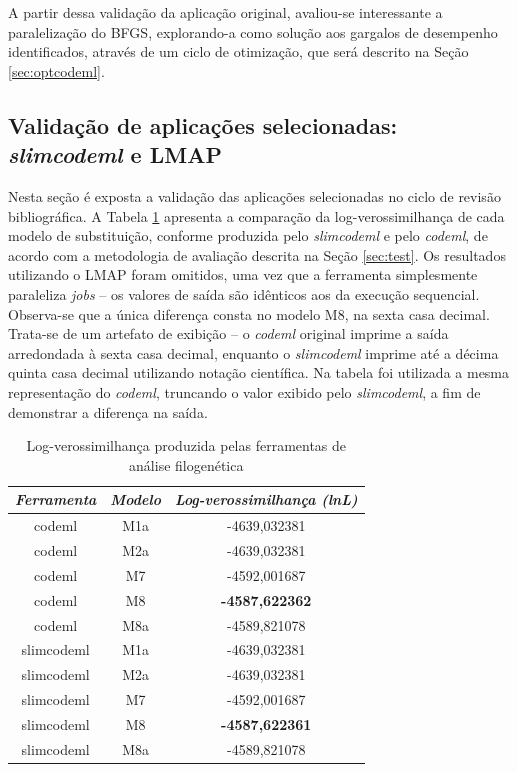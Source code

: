 \documentclass[cic,tc]{iiufrgs}
\begin{document}
A partir dessa validação da aplicação original, avaliou-se interessante a
paralelização do BFGS, explorando-a como solução aos gargalos de desempenho
identificados, através de um ciclo de otimização, que será descrito na Seção
\ref{sec:optcodeml}.

\subsection{Validação de aplicações selecionadas: \textit{slimcodeml} e LMAP}
\label{sec:slimeval}

Nesta seção é exposta a validação das aplicações selecionadas no ciclo de
revisão bibliográfica. A Tabela \ref{tbl:log} apresenta a comparação da
log-verossimilhança de cada modelo de substituição, conforme produzida pelo
\textit{slimcodeml} e pelo \textit{codeml}, de acordo com a metodologia de
avaliação descrita na Seção \ref{sec:test}. Os resultados utilizando o LMAP
foram omitidos, uma vez que a ferramenta simplesmente paraleliza \textit{jobs}
-- os valores de saída são idênticos aos da execução sequencial. Observa-se que
a única diferença consta no modelo M8, na sexta casa decimal. Trata-se de um
artefato de exibição -- o \textit{codeml} original imprime a saída arredondada
à sexta casa decimal, enquanto o \textit{slimcodeml} imprime até a décima
quinta casa decimal utilizando notação científica. Na tabela foi utilizada a
mesma representação do \textit{codeml}, truncando o valor exibido pelo
\textit{slimcodeml}, a fim de demonstrar a diferença na saída. 

\begin{table}[h]
    \caption{Log-verossimilhança produzida pelas ferramentas de análise filogenética}
    \centering
        \begin{tabular}{c|c|c}
          \hline
          \textit{Ferramenta}  &   \textit{Modelo} & \textit{Log-verossimilhança (lnL)} \\
          \hline
          \hline
          codeml            & M1a & -4639,032381 \\
          codeml            & M2a & -4639,032381 \\
          codeml            & M7  & -4592,001687 \\
          codeml            & M8  & \textbf{-4587,622362} \\
          codeml            & M8a & -4589,821078 \\
          slimcodeml        & M1a & -4639,032381 \\
          slimcodeml        & M2a & -4639,032381 \\
          slimcodeml        & M7  & -4592,001687 \\
          slimcodeml        & M8  & \textbf{-4587,622361} \\
          slimcodeml        & M8a & -4589,821078 \\
          \hline
        \end{tabular}
    \label{tbl:log}
\end{table}
\end{document}
